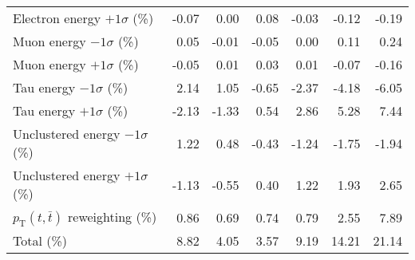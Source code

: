 \begin{table}[htbp]
{\begin{tabular}{lrrrrrr}
Electron energy $+1\sigma$ (\%) & -0.07 & 0.00 & 0.08 & -0.03 & -0.12 & -0.19 \\ 
Muon energy $-1\sigma$ (\%) & 0.05 & -0.01 & -0.05 & 0.00 & 0.11 & 0.24 \\ 
Muon energy $+1\sigma$ (\%) & -0.05 & 0.01 & 0.03 & 0.01 & -0.07 & -0.16 \\ 
Tau energy $-1\sigma$ (\%) & 2.14 & 1.05 & -0.65 & -2.37 & -4.18 & -6.05 \\ 
Tau energy $+1\sigma$ (\%) & -2.13 & -1.33 & 0.54 & 2.86 & 5.28 & 7.44 \\ 
Unclustered energy $-1\sigma$ (\%) & 1.22 & 0.48 & -0.43 & -1.24 & -1.75 & -1.94 \\ 
Unclustered energy $+1\sigma$ (\%) & -1.13 & -0.55 & 0.40 & 1.22 & 1.93 & 2.65 \\ 
$p_\mathrm{T}(t,\bar{t})$ reweighting (\%) & 0.86 & 0.69 & 0.74 & 0.79 & 2.55 & 7.89 \\ 
\hline 
Total (\%) & 8.82  & 4.05  & 3.57  & 9.19  & 14.21  & 21.14 \\ 
\hline 
\end{tabular}
}
\end{table}
